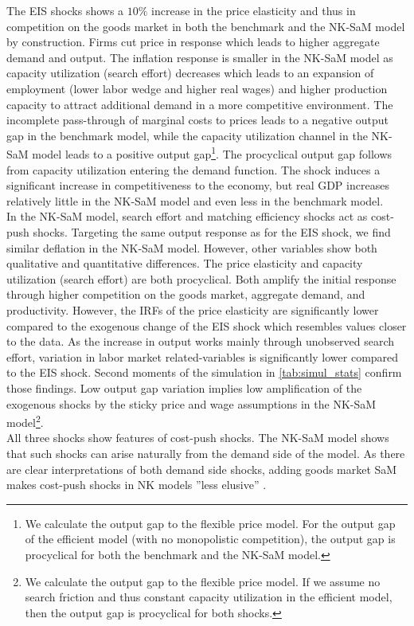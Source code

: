 \documentclass[12pt,3p,authoryear,review]{elsarticle}
\begin{document}
The EIS shocks shows a $10\%$ increase in the price elasticity and thus in competition on the goods market in both the benchmark and the NK-SaM model by construction. Firms cut price in response which leads to higher aggregate demand and output. The inflation response is smaller in the NK-SaM model as capacity utilization (search effort) decreases which leads to an expansion of employment (lower labor wedge and higher real wages) and higher production capacity to attract additional demand in a more competitive environment. The incomplete pass-through of marginal costs to prices leads to a negative output gap in the benchmark model, while the capacity utilization channel in the NK-SaM model leads to a positive output gap\footnote{We calculate the output gap to the flexible price model. For the output gap of the efficient model (with no monopolistic competition), the output gap is procyclical for both the benchmark and the NK-SaM model.}. The procyclical output gap follows from capacity utilization entering the demand function. The shock induces a significant increase in competitiveness to the economy, but real GDP increases relatively little in the NK-SaM model and even less in the benchmark model.\\%
In the NK-SaM model, search effort and matching efficiency shocks act as cost-push shocks. Targeting the same output response as for the EIS shock, we find similar deflation in the NK-SaM model. However, other variables show both qualitative and quantitative differences. The price elasticity and capacity utilization (search effort) are both procyclical. Both amplify the initial response through higher competition on the goods market, aggregate demand, and productivity. However, the IRFs of the price elasticity are significantly lower compared to the exogenous change of the EIS shock which resembles values closer to the data. As the increase in output works mainly through unobserved search effort, variation in labor market related-variables is significantly lower compared to the EIS shock. Second moments of the simulation in \cref{tab:simul_stats} confirm those findings. Low output gap variation implies low amplification of the exogenous shocks by the sticky price and wage assumptions in the NK-SaM model\footnote{We calculate the output gap to the flexible price model. If we assume no search friction and thus constant capacity utilization in the efficient model, then the output gap is procyclical for both shocks.}.\\%
All three shocks show features of cost-push shocks. The NK-SaM model shows that such shocks can arise naturally from the demand side of the model. As there are clear interpretations of both demand side shocks, adding goods market SaM makes cost-push shocks in NK models ''less elusive'' \citep{schmitt2025hotelling}.%
\end{document}
